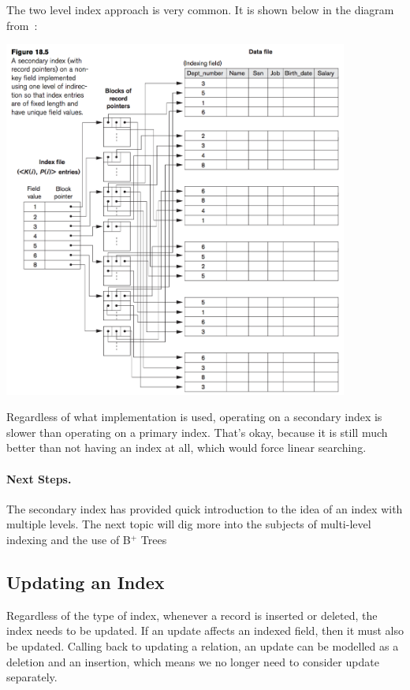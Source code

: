 The two level index approach is very common. It is shown below in the diagram from~\cite{fds}: 

\begin{center}
\includegraphics[width=0.85\textwidth]{images/secondary-index-2level}
\end{center}

Regardless of what implementation is used, operating on a secondary index is slower than operating on a primary index. That's okay, because it is still much better than not having an index at all, which would force linear searching. 

\paragraph{Next Steps.}
The secondary index has provided quick introduction to the idea of an index with multiple levels. The next topic will dig more into the subjects of multi-level indexing and the use of B$^{+}$ Trees 

\subsection*{Updating an Index}

Regardless of the type of index, whenever a record is inserted or deleted, the index needs to be updated. If an update affects an indexed field, then it must also be updated. Calling back to updating a relation, an update can be modelled as a deletion and an insertion, which means we no longer need to consider update separately.

